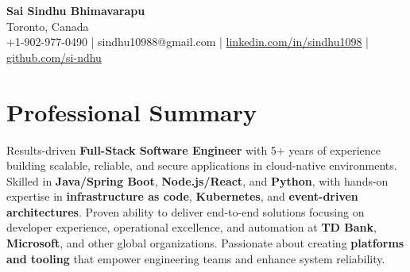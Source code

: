 \documentclass[letterpaper,11pt]{article}
\begin{document}
\begin{center}
  {\Large \textbf{Sai Sindhu Bhimavarapu}} \\
  Toronto, Canada \\
  +1-902-977-0490 \enspace | \enspace sindhu10988@gmail.com \enspace | \enspace \href{https://www.linkedin.com/in/sindhu1098/}{linkedin.com/in/sindhu1098} \enspace | \enspace \href{https://github.com/si-ndhu}{github.com/si-ndhu}
\end{center}

\section{Professional Summary}
  \begin{itemize}[leftmargin=0.15in, label={}]
    \small{\item{
     Results-driven \textbf{Full-Stack Software Engineer} with 5+ years of experience building scalable, reliable, and secure applications in cloud-native environments. Skilled in \textbf{Java/Spring Boot}, \textbf{Node.js/React}, and \textbf{Python}, with hands-on expertise in \textbf{infrastructure as code}, \textbf{Kubernetes}, and \textbf{event-driven architectures}. Proven ability to deliver end-to-end solutions focusing on developer experience, operational excellence, and automation at \textbf{TD Bank}, \textbf{Microsoft}, and other global organizations. Passionate about creating \textbf{platforms and tooling} that empower engineering teams and enhance system reliability.
    }}
  \end{itemize}
\vspace{-16pt}

\end{document}
